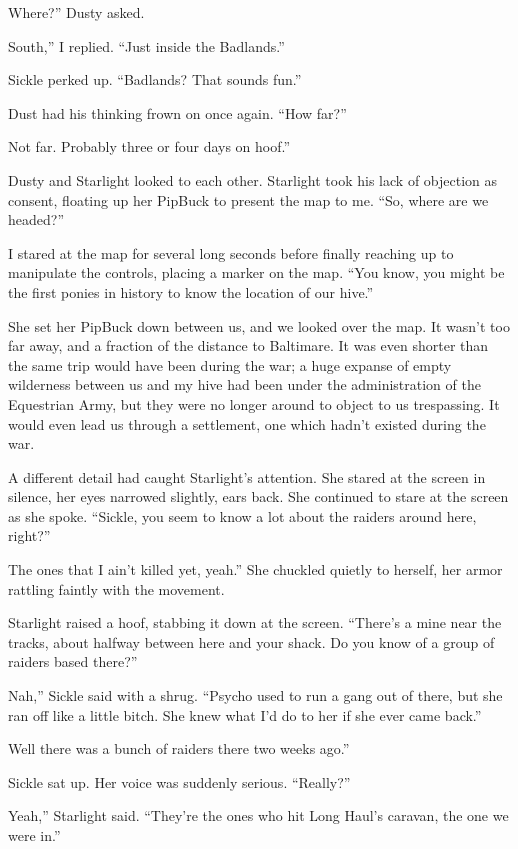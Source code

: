 \leavevmode{}Where?” Dusty asked.

\leavevmode{}South,” I replied. “Just inside the Badlands.”

Sickle perked up. “Badlands? That sounds fun.”

Dust had his thinking frown on once again. “How far?”

\leavevmode{}Not far. Probably three or four days on hoof.”

Dusty and Starlight looked to each other. Starlight took his lack of objection as consent, floating up her PipBuck to present the map to me. “So, where are we headed?”

I stared at the map for several long seconds before finally reaching up to manipulate the controls, placing a marker on the map. “You know, you might be the first ponies in history to know the location of our hive.”

She set her PipBuck down between us, and we looked over the map. It wasn’t too far away, and a fraction of the distance to Baltimare. It was even shorter than the same trip would have been during the war; a huge expanse of empty wilderness between us and my hive had been under the administration of the Equestrian Army, but they were no longer around to object to us trespassing. It would even lead us through a settlement, one which hadn’t existed during the war.

A different detail had caught Starlight’s attention. She stared at the screen in silence, her eyes narrowed slightly, ears back. She continued to stare at the screen as she spoke. “Sickle, you seem to know a lot about the raiders around here, right?”

\leavevmode{}The ones that I ain’t killed yet, yeah.” She chuckled quietly to herself, her armor rattling faintly with the movement.

Starlight raised a hoof, stabbing it down at the screen. “There’s a mine near the tracks, about halfway between here and your shack. Do you know of a group of raiders based there?”

\leavevmode{}Nah,” Sickle said with a shrug. “Psycho used to run a gang out of there, but she ran off like a little bitch. She knew what I’d do to her if she ever came back.”

\leavevmode{}Well there was a bunch of raiders there two weeks ago.”

Sickle sat up. Her voice was suddenly serious. “Really?”

\leavevmode{}Yeah,” Starlight said. “They’re the ones who hit Long Haul’s caravan, the one we were in.”

